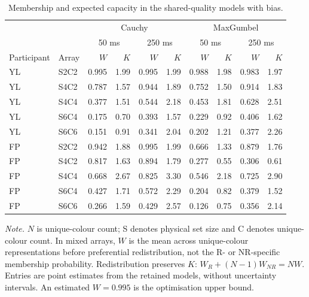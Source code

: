 \begin{table}[htbp]
\centering
\caption{Membership and expected capacity in the shared-quality models with bias.}
\label{tab:exp3_membership_capacity}
\small
\setlength{\tabcolsep}{3pt}
\begin{tabular}{llrrrrrrrr}
\hline
 & & \multicolumn{4}{c}{Cauchy} & \multicolumn{4}{c}{MaxGumbel} \\
 & & \multicolumn{2}{c}{50 ms} & \multicolumn{2}{c}{250 ms} & \multicolumn{2}{c}{50 ms} & \multicolumn{2}{c}{250 ms} \\
Participant & Array & $W$ & $K$ & $W$ & $K$ & $W$ & $K$ & $W$ & $K$ \\
\hline
YL & S2C2 & 0.995 & 1.99 & 0.995 & 1.99 & 0.988 & 1.98 & 0.983 & 1.97 \\
YL & S4C2 & 0.787 & 1.57 & 0.944 & 1.89 & 0.752 & 1.50 & 0.914 & 1.83 \\
YL & S4C4 & 0.377 & 1.51 & 0.544 & 2.18 & 0.453 & 1.81 & 0.628 & 2.51 \\
YL & S6C4 & 0.175 & 0.70 & 0.393 & 1.57 & 0.229 & 0.92 & 0.406 & 1.62 \\
YL & S6C6 & 0.151 & 0.91 & 0.341 & 2.04 & 0.202 & 1.21 & 0.377 & 2.26 \\
FP & S2C2 & 0.942 & 1.88 & 0.995 & 1.99 & 0.666 & 1.33 & 0.879 & 1.76 \\
FP & S4C2 & 0.817 & 1.63 & 0.894 & 1.79 & 0.277 & 0.55 & 0.306 & 0.61 \\
FP & S4C4 & 0.668 & 2.67 & 0.825 & 3.30 & 0.546 & 2.18 & 0.725 & 2.90 \\
FP & S6C4 & 0.427 & 1.71 & 0.572 & 2.29 & 0.204 & 0.82 & 0.379 & 1.52 \\
FP & S6C6 & 0.266 & 1.59 & 0.429 & 2.57 & 0.126 & 0.75 & 0.356 & 2.14 \\
\hline
\end{tabular}
\par\smallskip
\begin{minipage}{0.97\linewidth}
\small\textit{Note.} $N$ is unique-colour count; S denotes physical set size and C denotes unique-colour count. In mixed arrays, $W$ is the mean across unique-colour representations before preferential redistribution, not the R- or NR-specific membership probability. Redistribution preserves $K$: $W_R+(N-1)W_{NR}=NW$. Entries are point estimates from the retained models, without uncertainty intervals. An estimated $W=0.995$ is the optimisation upper bound.
\end{minipage}
\end{table}


